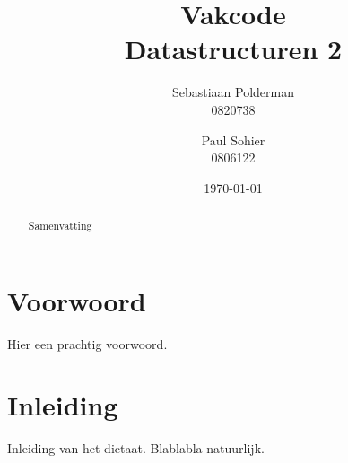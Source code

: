 \documentclass[a4paper,11pt]{report}
\begin{document}
\title{
  Vakcode\\
  Datastructuren 2
}
\author{
  Sebastiaan Polderman\\
  0820738\\
  \and
  Paul Sohier\\
  0806122
}
\date{\today}
\maketitle
\begin{abstract}\centering
Samenvatting
\end{abstract}

\chapter{Voorwoord}
Hier een prachtig voorwoord. 

\tableofcontents

\chapter{Inleiding}
Inleiding van het dictaat. Blablabla natuurlijk. 








\appendix


\printindex

\end{document}
